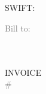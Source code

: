 \documentclass[a4paper]{article}
\begin{document}
\begin{minipage}[c][15em][t]{0.55\textwidth}
  \textbf{\companyname{}}\\
  \companyvatid{}\\
  \companyaddress{}

  \vspace{1em}

  \bankname{}\\
  \bankiban{}\\
  SWIFT: \bankswift{}\\
  \bankaddress{}

  \vspace{2em}

  \textcolor{gray}{Bill to:}\\
  \invoiceename\\
  \invoiceevatid\\
  \invoiceeaddress

\end{minipage}
\begin{minipage}[c][15em][t]{0.40\textwidth}

  \flushright
  \Huge{INVOICE}\\
  \Large\textcolor{gray}{\# \invoicenum{}}

\end{minipage}
\end{document}
